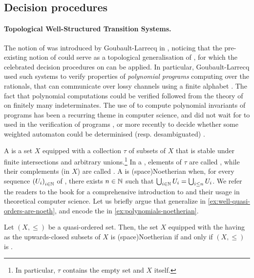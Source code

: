 \subsection{Decision procedures}

\paragraph{Topological Well-Structured Transition Systems.} \AP The notion of
 was introduced by
Goubault-Larrecq in \cite{JGL07}, noticing that the pre-existing notion of
 could serve as a topological generalisation of
, for which the celebrated decision procedures on
 can be applied. In particular,
Goubault-Larrecq used such systems to verify properties of \emph{polynomial
programs} computing over the rationals, that can communicate over lossy
channels using a finite alphabet \cite{JGL10}. The fact that polynomial
computations could be verified followed from the theory of 
on finitely many indeterminates. The use of  to compute
polynomial invariants of programs has been a recurring theme in computer
science, and did not wait for  to used in the verification of programs \cite{MULSEI02}, or more
recently to decide whether some weighted automaton could be determinised (resp.
desambiguated) \cite{BESM23,PUSM24}.

\AP A  is a set $X$ equipped with a collection $\tau$
of subsets of $X$ that is stable under finite intersections and arbitrary
unions.\footnote{In particular, $\tau$ contains the empty set and $X$ itself.}
In a , elements of $\tau$ are called , while their complements (in $X$) are called . A
 is \intro(space){Noetherian} when, for every sequence
$\seqof{U_i}[i \in \N]$ of , there exists $n \in \mathbb{N}$ such that
$\bigcup_{i \in \mathbb{N}} U_i = \bigcup_{i \leq n} U_i$. We refer the readers to the
book \cite{JGL13} for a comprehensive introduction to 
and their usage in theoretical computer science. Let us briefly argue that
 generalize  in
\cref{ex:well-quasi-orders-are-noeth}, and encode the
 in \cref{ex:polynomials-noetherian}.

\begin{example}
  \label{ex:well-quasi-orders-are-noeth}
  Let $(X, \leq)$ be a quasi-ordered set.
  Then, the set $X$ equipped with the  having 
  as  the upwards-closed subsets of $X$ is \kl(space){Noetherian}
  if and only if $(X, \leq)$ is .
\end{example}

